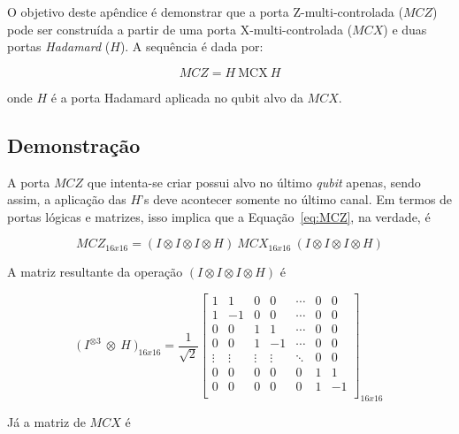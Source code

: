 \label{ap:apendiceC}

O objetivo deste apêndice é demonstrar que a porta Z-multi-controlada ($MCZ$) pode ser construída a partir de uma porta X-multi-controlada ($MCX$) e duas portas \textit{Hadamard} (\(H\)). A sequência é dada por:

\begin{equation}
    MCZ = H~\text{MCX}~H
    \label{eq:MCZ}
\end{equation}

onde \(H\) é a porta Hadamard aplicada no qubit alvo da $MCX$.

\subsection*{Demonstração}

A porta $MCZ$ que intenta-se criar possui alvo no último \textit{qubit} apenas, sendo assim, a aplicação das $H$'s deve acontecer somente no último canal. Em termos de portas lógicas e matrizes, isso implica que a Equação~\ref{eq:MCZ}, na verdade, é

\begin{equation}
    MCZ_{16x16} = (I \otimes I \otimes I \otimes H)~MCX_{16x16}~(I \otimes I \otimes I \otimes H)
    \label{eq:MCZ 2}
\end{equation}

A matriz resultante da operação $(I \otimes I \otimes I \otimes H)$ é

\begin{equation}
    \bigl(~I^{\otimes 3}~ \otimes ~H~\bigr)_{16x16} = \frac{1}{\sqrt{2}}
    \begin{bmatrix}
        1 & 1 & 0 & 0 & \cdots & 0 & 0 \\
        1 & -1 & 0 & 0 & \cdots & 0 & 0 \\
        0 & 0 & 1 & 1 & \cdots & 0 & 0 \\
        0 & 0 & 1 & -1 & \cdots & 0 & 0 \\
        \vdots & \vdots & \vdots & \vdots & \ddots & 0 & 0 \\
        0 & 0 & 0 & 0 & 0 & 1 & 1 \\
        0 & 0 & 0 & 0 & 0 & 1 & -1 \\
    \end{bmatrix}
    _{16x16}
\end{equation}

Já a matriz de $MCX$ é

